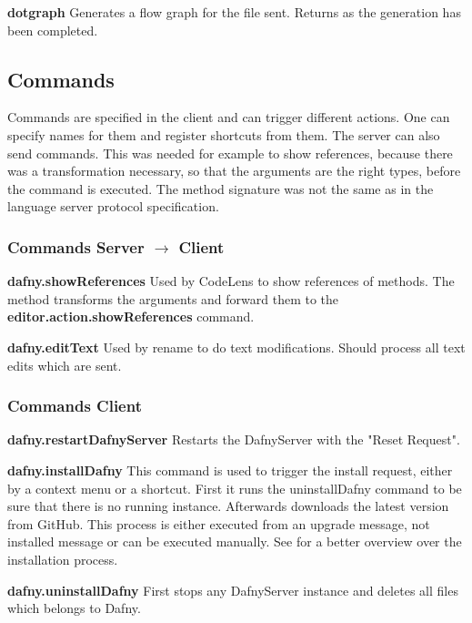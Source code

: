 \textbf{dotgraph}
Generates a flow graph for the file sent. Returns as the generation has been completed. \newline


\subsection{Commands}
Commands are specified in the client and can trigger different actions. One can specify names for them and register shortcuts from them. The server can also send commands. This was needed for example to show references, because there was a transformation necessary, so that the arguments are the right types, before the command is executed. The method signature was not the same as in the language server protocol specification. 

\subsubsection{Commands Server $\longrightarrow$ Client}
\textbf{dafny.showReferences}
Used by CodeLens to show references of methods. The method transforms the arguments and forward them to the \textbf{editor.action.showReferences} command. 

\textbf{dafny.editText}
Used by rename to do text modifications. Should process all text edits which are sent. 

\subsubsection{Commands Client}

\textbf{dafny.restartDafnyServer}
Restarts the DafnyServer with the "Reset Request".\newline

\textbf{dafny.installDafny}
This command is used to trigger the install request, either by a context menu or a shortcut. 
First it runs the uninstallDafny command to be sure that there is no running instance. Afterwards downloads the latest version from GitHub. This process is either executed from an upgrade message, not installed message or can be executed manually. 
See  for a better overview over the installation process. \newline

\textbf{dafny.uninstallDafny}
First stops any DafnyServer instance and deletes all files which belongs to Dafny. \newline

